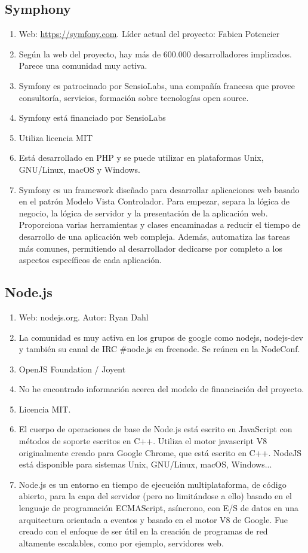 \subsection{Symphony}
\begin{enumerate}
    \item Web: \url{https://symfony.com}. Líder actual del proyecto: Fabien Potencier
    \item Según la web del proyecto, hay más de 600.000 desarrolladores implicados. Parece una comunidad muy activa.
    \item Symfony es patrocinado por SensioLabs, una compañía francesa que provee consultoría, servicios, formación sobre tecnologías open source.
    \item Symfony está financiado por SensioLabs
    \item Utiliza licencia MIT
    \item Está desarrollado en PHP y se puede utilizar en plataformas Unix, GNU/Linux, macOS y Windows.
    \item Symfony es un framework diseñado para desarrollar aplicaciones web basado en el patrón Modelo Vista Controlador. Para empezar, separa la lógica de negocio, la lógica de servidor y la presentación de la aplicación web. Proporciona varias herramientas y clases encaminadas a reducir el tiempo de desarrollo de una aplicación web compleja. Además, automatiza las tareas más comunes, permitiendo al desarrollador dedicarse por completo a los aspectos específicos de cada aplicación.
\end{enumerate}


\subsection{Node.js}
\begin{enumerate}
    \item Web: nodejs.org. Autor:  Ryan Dahl
    \item La comunidad es muy activa en los grupos de google como nodejs, nodejs-dev y también su canal de IRC \#node.js en freenode. Se reúnen en la NodeConf.
    \item OpenJS Foundation / Joyent
    \item No he encontrado información acerca del modelo de financiación del proyecto.
    \item Licencia MIT.
    \item El cuerpo de operaciones de base de Node.js está escrito en JavaScript con métodos de soporte escritos en C++. Utiliza el motor javascript V8 originalmente creado para Google Chrome, que está escrito en C++. NodeJS está disponible para sistemas Unix, GNU/Linux, macOS, Windows...
    \item Node.js es un entorno en tiempo de ejecución multiplataforma, de código abierto, para la capa del servidor (pero no limitándose a ello) basado en el lenguaje de programación ECMAScript, asíncrono, con E/S de datos en una arquitectura orientada a eventos y basado en el motor V8 de Google. Fue creado con el enfoque de ser útil en la creación de programas de red altamente escalables, como por ejemplo, servidores web.
\end{enumerate}


